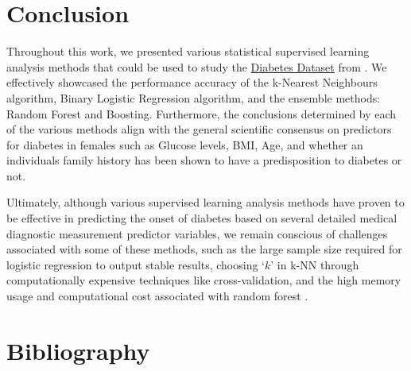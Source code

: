 \documentclass[12pt]{article}
\begin{document}
\section{Conclusion}
\indent
\onehalfspacing

Throughout this work, we presented various statistical supervised learning analysis methods that could be used to study the \href{https://www.kaggle.com/datasets/hasibur013/diabetes-dataset}{Diabetes Dataset} from \cite{Kaggles}. We effectively showcased the performance accuracy of the k-Nearest Neighbours algorithm, Binary Logistic Regression algorithm, and the ensemble methods: Random Forest and Boosting. Furthermore, the conclusions determined by each of the various methods align with the general scientific consensus on predictors for diabetes in females such as Glucose levels, BMI, Age, and whether an individuals family history has been shown to have a predisposition to diabetes or not. 

Ultimately, although various supervised learning analysis methods have proven to be effective in predicting the onset of diabetes based on several detailed medical diagnostic measurement predictor variables, we remain conscious of challenges associated with some of these methods, such as the large sample size required for logistic regression to output stable results, choosing ‘$k$’ in k-NN through computationally expensive techniques like cross-validation, and the high memory usage and computational cost associated with random forest \citep{7724478}.


 \section{Bibliography}
 \singlespacing
  
 
\end{document}
